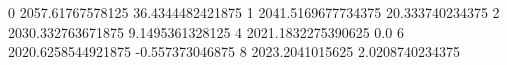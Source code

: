 0 2057.61767578125 36.4344482421875
1 2041.5169677734375 20.333740234375
2 2030.332763671875 9.1495361328125
4 2021.1832275390625 0.0
6 2020.6258544921875 -0.557373046875
8 2023.2041015625 2.0208740234375
